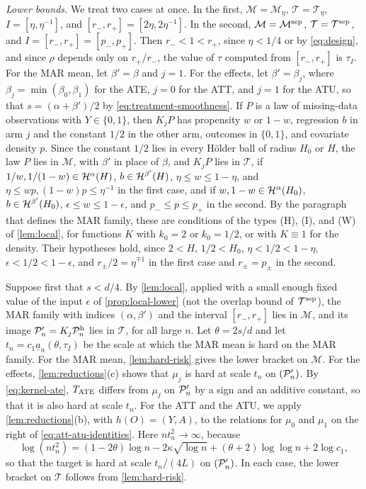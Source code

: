 \emph{Lower bounds.} We treat two cases at once. In the first,
$\mathcal M=\mathcal M_\eta$, $\mathcal T=\mathcal T_\eta$,
$I=[\eta,\eta^{-1}]$, and $[r_-,r_+]=[2\eta,2\eta^{-1}]$. In the second,
$\mathcal M=\mathcal M^{\rm sep}$, $\mathcal T=\mathcal T^{\rm sep}$, and
$I=[r_-,r_+]=[p_-,p_+]$. Then $r_-<1<r_+$, since $\eta<1/4$ or by
\eqref{eq:design}, and since $\rho$ depends only on $r_+/r_-$, the
value of $\tau$ computed from $[r_-,r_+]$ is $\tau_I$. For the MAR mean,
let $\beta'=\beta$ and $j=1$. For the effects, let $\beta'=\beta_j$,
where $\beta_j=\min(\beta_0,\beta_1)$ for the ATE, $j=0$ for the ATT,
and $j=1$ for the ATU, so that $s=(\alpha+\beta')/2$ by
\eqref{eq:treatment-smoothness}. If $P$ is a law of missing-data
observations with $Y\in\{0,1\}$, then $K_jP$ has propensity $w$ or
$1-w$, regression $b$ in arm $j$ and the constant $1/2$ in the other
arm, outcomes in $\{0,1\}$, and covariate density $p$. Since the
constant $1/2$ lies in every H\"older ball of radius $H_0$ or $H$, the
law $P$ lies in $\mathcal M$, with $\beta'$ in place of $\beta$, and $K_jP$ lies
in $\mathcal T$, if
$1/w,1/(1-w)\in\mathcal H^\alpha(H)$, $b\in\mathcal H^{\beta'}(H)$,
$\eta\le w\le1-\eta$, and $\eta\le wp,(1-w)p\le\eta^{-1}$ in the first
case, and if $w,1-w\in\mathcal H^\alpha(H_0)$, $b\in\mathcal H^{\beta'}(H_0)$,
$\epsilon\le w\le1-\epsilon$, and $p_-\le p\le p_+$ in the second. By
the paragraph that defines the MAR family, these are conditions of
the types (H), (I), and (W) of \cref{lem:local}, for functions $K$
with $k_0=2$ or $k_0=1/2$, or with $K\equiv1$ for the density. Their
hypotheses hold, since $2<H$, $1/2<H_0$, $\eta<1/2<1-\eta$,
$\epsilon<1/2<1-\epsilon$, and $r_\pm/2=\eta^{\mp1}$ in the first case
and $r_\pm=p_\pm$ in the second.

Suppose first that $s<d/4$. By \cref{lem:local}, applied with a
small enough fixed value of the input $\epsilon$ of
\cref{prop:local-lower} (not the overlap bound of
$\mathcal T^{\rm sep}$), the MAR family with indices $(\alpha,\beta')$
and the interval $[r_-,r_+]$ lies in $\mathcal M$, and its image
$\mathcal P'_n=K_j\mathcal P^{\rm h}_n$ lies in $\mathcal T$, for all large $n$. Let
$\theta=2s/d$ and let $t_n=c_1\underline a_n(\theta,\tau_I)$ be the
scale at which the MAR mean is hard on the MAR family. For the MAR
mean, \cref{lem:hard-risk} gives the lower bracket on
$\mathcal M$. For the effects, \cref{lem:reductions}(c) shows that
$\mu_j$ is hard at scale $t_n$ on $(\mathcal P'_n)$. By \eqref{eq:kernel-ate},
$T_{\rm ATE}$ differs from $\mu_j$ on $\mathcal P'_n$ by a sign and an
additive constant, so that it is also hard at scale $t_n$. For the ATT
and the ATU, we apply \cref{lem:reductions}(b), with $h(O)=(Y,A)$,
to the relations for $\mu_0$ and $\mu_1$ on the right of
\eqref{eq:att-atu-identities}. Here $nt_n^2\to\infty$, because
\[
 \log(nt_n^2)=(1-2\theta)\log n-2\kappa\sqrt{\log n}
 +(\theta+2)\log\log n+2\log c_1,
\]
so that the target is hard at scale $t_n/(4L)$ on $(\mathcal P'_n)$. In each
case, the lower bracket on $\mathcal T$ follows from
\cref{lem:hard-risk}.

